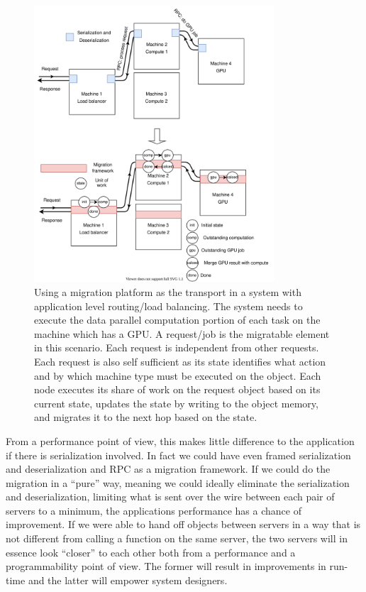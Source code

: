 \begin{figure}[t]
\centering

\includegraphics[width=0.8\textwidth]{migration-transport.drawio}
\caption{
    Using a migration platform as the transport in a system with
    application level routing/load balancing. The system needs to execute
    the data parallel computation portion of each task on the machine
    which has a GPU. A request/job is the
    migratable element in this scenario. Each request is independent
    from other requests. Each request is also self sufficient as its
    state identifies what action and by which machine type must be
    executed on the object. Each node executes its share of work
    on the request object based on its current state, updates the state by
    writing to the object memory, and migrates it to the next hop based
    on the state.
}
\label{fig:migrationtransport}
\end{figure}

From a performance point of view, this makes little difference to the
application if there is serialization involved. In fact we could have
even framed
serialization and deserialization and RPC as a migration framework. If we
could do the migration in a ``pure'' way, meaning we could ideally
eliminate the serialization and deserialization, limiting what is sent
over the wire between each pair of servers to a minimum, the applications
performance has a chance of improvement. If we were able to hand off
objects between servers in a way that is not different from calling a
function on the same server, the two servers will in essence look
``closer'' to each other both from a performance and a programmability
point of view. The former will result in improvements in run-time and
the latter will empower system designers.

